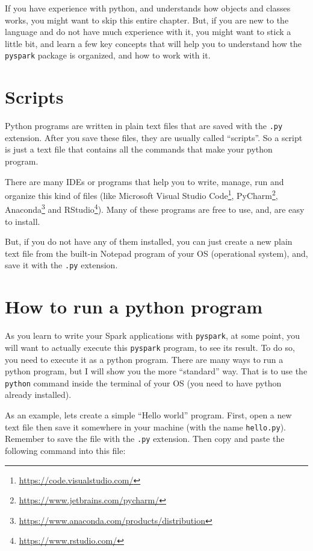 \documentclass[
  11pt,
  letterpaper,
  DIV=11,
  numbers=noendperiod]{scrreprt}
\begin{document}
If you have experience with python, and understands how objects and
classes works, you might want to skip this entire chapter. But, if you
are new to the language and do not have much experience with it, you
might want to stick a little bit, and learn a few key concepts that will
help you to understand how the \texttt{pyspark} package is organized,
and how to work with it.

\hypertarget{scripts}{%
\section{Scripts}\label{scripts}}

Python programs are written in plain text files that are saved with the
\texttt{.py} extension. After you save these files, they are usually
called ``scripts''. So a script is just a text file that contains all
the commands that make your python program.

There are many IDEs or programs that help you to write, manage, run and
organize this kind of files (like Microsoft Visual Studio
Code\footnote{\url{https://code.visualstudio.com/}}, PyCharm\footnote{\url{https://www.jetbrains.com/pycharm/}},
Anaconda\footnote{\url{https://www.anaconda.com/products/distribution}}
and RStudio\footnote{\url{https://www.rstudio.com/}}). Many of these
programs are free to use, and, are easy to install.

But, if you do not have any of them installed, you can just create a new
plain text file from the built-in Notepad program of your OS
(operational system), and, save it with the \texttt{.py} extension.

\hypertarget{how-to-run-a-python-program}{%
\section{How to run a python
program}\label{how-to-run-a-python-program}}

As you learn to write your Spark applications with \texttt{pyspark}, at
some point, you will want to actually execute this \texttt{pyspark}
program, to see its result. To do so, you need to execute it as a python
program. There are many ways to run a python program, but I will show
you the more ``standard'' way. That is to use the \texttt{python}
command inside the terminal of your OS (you need to have python already
installed).

As an example, lets create a simple ``Hello world'' program. First, open
a new text file then save it somewhere in your machine (with the name
\texttt{hello.py}). Remember to save the file with the \texttt{.py}
extension. Then copy and paste the following command into this file:
\end{document}
